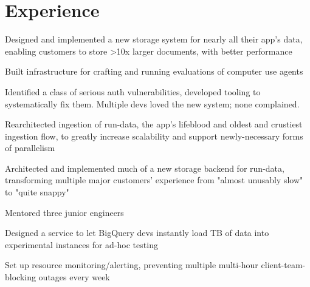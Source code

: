 \documentclass[]{resume}
\begin{document}
\begin{minipage}[t]{0.66\textwidth}




\section{Experience}

\vspace{\topsep} %
\begin{tightemize}
\item Designed and implemented a new storage system for nearly all their app's data, enabling customers to store >10x larger documents, with better performance
\item Built infrastructure for crafting and running evaluations of computer use agents
\end{tightemize}
\sectionsep

\vspace{\topsep} %
\begin{tightemize}
\item Identified a class of serious auth vulnerabilities, developed tooling to systematically fix them. Multiple devs loved the new system; none complained.
\item Rearchitected ingestion of run-data, the app's lifeblood and oldest and crustiest ingestion flow, to greatly increase scalability and support newly-necessary forms of parallelism
\item Architected and implemented much of a new storage backend for run-data, transforming multiple major customers' experience from "almost unusably slow" to "quite snappy"
\item Mentored three junior engineers
\end{tightemize}
\sectionsep

\begin{tightemize}
\item Designed a service to let BigQuery devs instantly load TB of data into experimental instances for ad-hoc testing
\item Set up resource monitoring/alerting, preventing multiple multi-hour client-team-blocking outages every week
\end{tightemize}
\sectionsep
    

\end{minipage}
\end{document}
